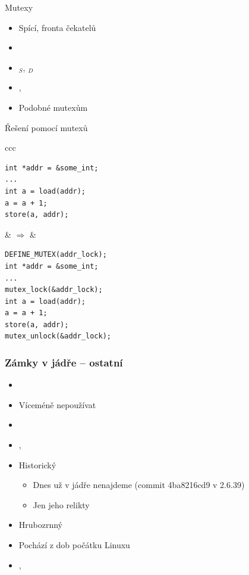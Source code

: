 \begin{frame}[fragile]{Mutexy}

  \begin{itemize}
    \item Spící, fronta čekatelů
    \item {}
    \item {}$_S$, $_D$

    \pause

    \item {}, 
    \item Podobné  mutexům
  \end{itemize}

  \pause

  \begin{block}{Řešení pomocí mutexů}
  \begin{center}
  \begin{tabular}{ccc}
  \begin{lstlisting}
int *addr = &some_int;
...
int a = load(addr);
a = a + 1;
store(a, addr);
  \end{lstlisting} & $\Rightarrow$ &
  \begin{lstlisting}
DEFINE_MUTEX(addr_lock);
int *addr = &some_int;
...
mutex_lock(&addr_lock);
int a = load(addr);
a = a + 1;
store(a, addr);
mutex_unlock(&addr_lock);
  \end{lstlisting}
  \end{tabular}
  \end{center}
  \end{block}

\end{frame}

\begin{frame}
  \frametitle{Zámky v jádře -- ostatní}

  \begin{itemize}
    \item {}
    \item Víceméně nepoužívat
    \item {}
    \item {}, 
  \end{itemize}

  \pause
  \medskip
  \medskip

  \begin{itemize}
    \item Historický
    \begin{itemize}
      \item Dnes už v jádře nenajdeme (commit 4ba8216cd9 v 2.6.39)
      \item Jen jeho relikty
    \end{itemize}
    \item Hrubozrnný
    \item Pochází z dob počátku Linuxu
    \item {}, 
  \end{itemize}

\end{frame}

